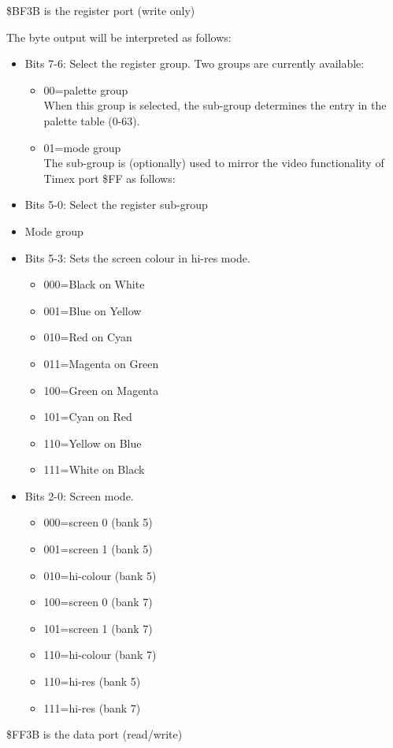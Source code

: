 \$BF3B is the register port (write only)

The byte output will be interpreted as follows:
\begin{itemize}
\item Bits 7-6: Select the register group. Two groups are currently available:
  \begin{itemize}
  \item 00=palette group\\
    When this group is selected, the sub-group determines the entry in the
    palette table (0-63).
  \item 01=mode group\\
    The sub-group is (optionally) used to mirror the video functionality
    of Timex port \$FF as follows:
  \end{itemize}
\item Bits 5-0: Select the register sub-group
\item[] Mode group
\item Bits 5-3: Sets the screen colour in hi-res mode.
  \begin{itemize}
  \item 000=Black on White
  \item 001=Blue on Yellow
  \item 010=Red on Cyan
  \item 011=Magenta on Green
  \item 100=Green on Magenta
  \item 101=Cyan on Red
  \item 110=Yellow on Blue
  \item 111=White on Black
  \end{itemize}
\item Bits 2-0: Screen mode.
  \begin{itemize}
  \item 000=screen 0 (bank 5)
  \item 001=screen 1 (bank 5)
  \item 010=hi-colour (bank 5)
  \item 100=screen 0 (bank 7)
  \item 101=screen 1 (bank 7)
  \item 110=hi-colour (bank 7)
  \item 110=hi-res (bank 5)
  \item 111=hi-res (bank 7)
  \end{itemize}
\end{itemize}

\$FF3B is the data port (read/write)

